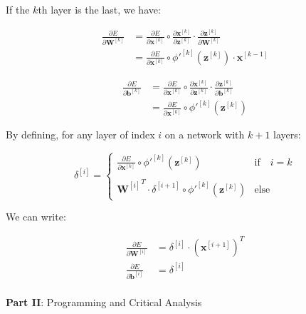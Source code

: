 \documentclass[12pt]{article}
\begin{document}
\begin{enumerate}[leftmargin=\labelsep]
    If the $k$th layer is the last, we have:

    \begin{equation}
    \begin{aligned}
        \frac{\partial E}{\partial \mathbf{W}^{[k]}} &= \frac{\partial E}{\partial \mathbf{x}^{[k]}} \circ \frac{\partial \mathbf{x}^{[k]}}{\partial \mathbf{z}^{[k]}} \cdot \frac{\partial \mathbf{z}^{[k]}}{\partial \mathbf{W}^{[k]}} \\
        &= \frac{\partial E}{\partial \mathbf{x}^{[k]}} \circ \phi'^{[k]}(\mathbf{z}^{[k]}) \cdot \mathbf{x}^{[k-1]}
    \end{aligned}
    \end{equation}

    \begin{equation}
    \begin{aligned}
        \frac{\partial E}{\partial \mathbf{b}^{[k]}} &= \frac{\partial E}{\partial \mathbf{x}^{[k]}} \circ \frac{\partial \mathbf{x}^{[k]}}{\partial \mathbf{z}^{[k]}} \cdot \frac{\partial \mathbf{z}^{[k]}}{\partial \mathbf{b}^{[k]}} \\
        &= \frac{\partial E}{\partial \mathbf{x}^{[k]}} \circ \phi'^{[k]}(\mathbf{z}^{[k]})
    \end{aligned}
    \end{equation}

    By defining, for any layer of index $i$ on a network with $k+1$ layers:

    \begin{equation}
        \delta^{[i]} = \left\{
        \begin{array}{ll}
            \frac{\partial E}{\partial \mathbf{x}^{[k]}} \circ \phi'^{[k]}(\mathbf{z}^{[k]}) & \textrm{if} \quad i = k \\
            \\
            {\mathbf{W}^{[i]}}^T \cdot \delta^{[i+1]} \circ \phi'^{[k]}(\mathbf{z}^{[k]})  & \textrm{else}
        \end{array} 
        \right.
    \end{equation}

    We can write:

    \begin{equation}
    \begin{aligned}
        \frac{\partial E}{\partial \mathbf{W}^{[i]}} &= \delta^{[i]} \cdot {(\mathbf{x}^{[i+1]})}^T \\
        \frac{\partial E}{\partial \mathbf{b}^{[i]}} &= \delta^{[i]} \\
    \end{aligned}
    \end{equation}

\end{enumerate}

\vskip 1cm

\large{\textbf{Part II}: Programming and Critical Analysis}\normalsize
\end{document}
